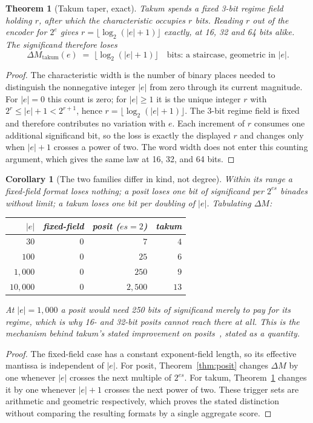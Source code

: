 \documentclass[11pt]{article}
\newtheorem{theorem}{Theorem}
\newtheorem{corollary}{Corollary}
\theoremstyle{definition}
\begin{document}
\begin{theorem}[Takum taper, exact]\label{thm:takum}
Takum spends a fixed 3-bit regime field holding $r$, after which the
characteristic occupies $r$ bits. Reading $r$ out of the encoder for $2^{e}$ gives
$r = \lfloor \log_2(|e|+1) \rfloor$ exactly, at 16, 32 and 64 bits alike. The
significand therefore loses
\[
  \Delta M_{\text{takum}}(e) \;=\; \bigl\lfloor \log_2(|e|+1) \bigr\rfloor
  \quad\text{bits: a staircase, geometric in } |e| .
\]
\end{theorem}
\begin{proof}
The characteristic width is the number of binary places needed to distinguish
the nonnegative integer $|e|$ from zero through its current magnitude.
For $|e|=0$ this count is zero; for $|e|\ge1$ it is the unique integer $r$
with $2^r\le |e|+1<2^{r+1}$, hence
$r=\lfloor\log_2(|e|+1)\rfloor$.
The 3-bit regime field is fixed and therefore contributes no variation with
$e$. Each increment of $r$ consumes one additional significand bit, so the
loss is exactly the displayed $r$ and changes only when $|e|+1$ crosses a
power of two. The word width does not enter this counting argument, which
gives the same law at 16, 32, and 64 bits.
\end{proof}


\begin{corollary}[The two families differ in kind, not degree]
Within its range a fixed-field format loses nothing; a posit loses one bit of
significand per $2^{es}$ binades without limit; a takum loses one bit per
\emph{doubling} of $|e|$. Tabulating $\Delta M$:

\begin{center}
\begin{tabular}{rrrr}
\toprule
$|e|$ & fixed-field & posit ($es{=}2$) & takum \\
\midrule
$30$      & $0$ & $7$    & $4$ \\
$100$     & $0$ & $25$   & $6$ \\
$1{,}000$   & $0$ & $250$  & $9$ \\
$10{,}000$  & $0$ & $2{,}500$ & $13$ \\
\bottomrule
\end{tabular}
\end{center}

At $|e| = 1{,}000$ a posit would need 250 bits of significand merely to pay for
its regime, which is why 16- and 32-bit posits cannot reach there at all. This is
the mechanism behind takum's stated improvement on posits~\cite{takum}, stated as
a quantity.
\end{corollary}
\begin{proof}
The fixed-field case has a constant exponent-field length, so its effective
mantissa is independent of $|e|$.  For posit, Theorem~\ref{thm:posit} changes
$\Delta M$ by one whenever $|e|$ crosses the next multiple of $2^{es}$.
For takum, Theorem~\ref{thm:takum} changes it by one whenever $|e|+1$
crosses the next power of two.  These trigger sets are arithmetic and
geometric respectively, which proves the stated distinction without comparing
the resulting formats by a single aggregate score.
\end{proof}
\end{document}
